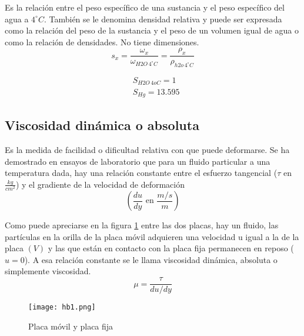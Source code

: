 \begin{definition}
    Es la relación entre el peso específico de una sustancia y el peso específico del agua a $4^{\circ}C$.
    También se le denomina densidad relativa y puede ser expresada como la relación del peso de la sustancia y el peso de un volumen igual de agua o como la relación de densidades. No tiene dimensiones. 
    \begin{equation}
        s_x=\frac{\omega_x}{\omega_{H2O\, 4^{\circ}C}}=\frac{\rho_x}{\rho_{h2o\, 4^{\circ}C}}
    \end{equation}
\end{definition}
\begin{align*}
    &S_{H2O\, 4oC}=1\\
    &S_{Hg}=13.595
\end{align*}

\subsection{Viscosidad dinámica o absoluta}

\begin{definition}
    Es la medida de facilidad o dificultad relativa con que puede deformarse. Se ha demostrado en ensayos de laboratorio que para un fluido particular a una temperatura dada, hay una relación constante entre el esfuerzo tangencial ($\tau$ en $\frac{kg}{cm^2}$) y el gradiente de la velocidad de deformación
    \begin{equation*}
        \left(\frac{du}{dy}\text{ en }\frac{m/s}{m}\right)
    \end{equation*}
\end{definition}

Como puede apreciarse en la figura \ref{hb1} entre las dos placas, hay un fluido, las partículas en la orilla de la placa móvil adquieren una velocidad u igual a la de la placa $(V)$ y las que están en contacto con la placa fija permanecen en reposo ($u=0$). A esa relación constante se le llama viscosidad dinámica, absoluta o simplemente viscosidad.
    \begin{equation}
        \mu=\frac{\tau}{du/dy}
    \end{equation}

\begin{figure}[h!]
  \centerline{\texttt{[image: hb1.png]}}
  \caption{Placa móvil y placa fija}
  \label{hb1}
\end{figure}



